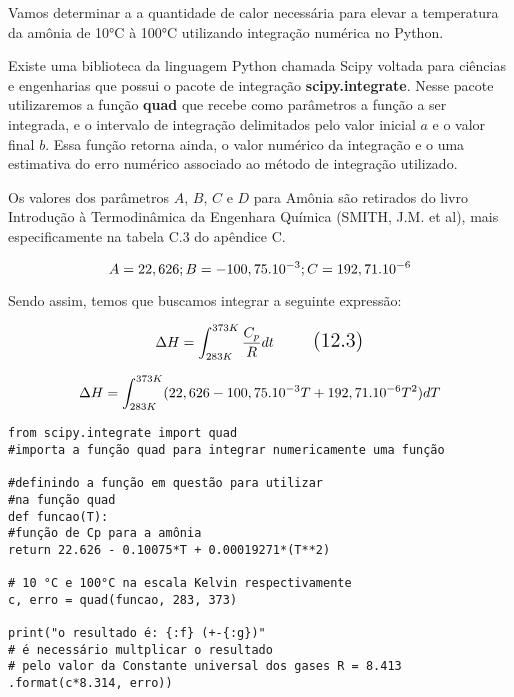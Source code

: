 Vamos determinar a a quantidade de calor necessária para elevar a temperatura da amônia de 10°C à 100°C utilizando integração numérica no Python.

Existe uma biblioteca da linguagem Python chamada Scipy voltada para ciências e engenharias que possui o pacote de integração \textbf{scipy.integrate}. Nesse pacote utilizaremos a função \textbf{quad} que recebe como parâmetros a função a ser integrada, e o intervalo de integração delimitados pelo valor inicial $a$ e o valor final $b$. Essa função retorna ainda, o valor numérico da integração e o uma estimativa do erro numérico associado ao método de integração utilizado.

Os valores dos parâmetros $A$, $B$, $C$ e $D$ para Amônia são retirados do livro Introdução à Termodinâmica da Engenhara Química (SMITH, J.M. et al), mais especificamente na tabela C.3 do apêndice C.

$$\Large A=22,626; B=-100,75.10^{-3}; C = 192,71.10^{-6}$$

Sendo assim, temos que buscamos integrar a seguinte expressão:

\begin{equation}
\Large \Delta H = \int_{283K}^{373K} \frac{C_{p}}{R}dt
\tag{12.3}
\end{equation}

$$\Large \Delta H = \int_{283K}^{373K} (22,626 - 100,75.10^{-3}T + 192,71.10^{-6}T^2)dT$$

\begin{verbatim}
from scipy.integrate import quad
#importa a função quad para integrar numericamente uma função

#definindo a função em questão para utilizar 
#na função quad
def funcao(T):
#função de Cp para a amônia 
return 22.626 - 0.10075*T + 0.00019271*(T**2) 

# 10 °C e 100°C na escala Kelvin respectivamente
c, erro = quad(funcao, 283, 373) 

print("o resultado é: {:f} (+-{:g})"
# é necessário multplicar o resultado 
# pelo valor da Constante universal dos gases R = 8.413
.format(c*8.314, erro)) 
\end{verbatim}